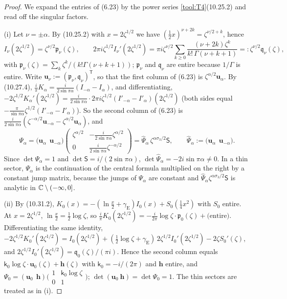 \begin{proof}
We expand the entries of (6.23) by the power series \ref{tool:T4}(10.25.2) and read off the singular factors.

(i) Let $\nu=\pm\alpha$. By (10.25.2) with $x=2\zeta^{1/2}$ we have $(\frac12x)^{\nu+2k}=\zeta^{\nu/2+k}$, hence
\[
  I_\nu(2\zeta^{1/2})=\zeta^{\nu/2}\mathfrak p_\nu(\zeta),\qquad
  2\pi i\zeta^{1/2}I_\nu'(2\zeta^{1/2})=\pi i\zeta^{\nu/2}\sum_{k\ge0}\frac{(\nu+2k)\zeta^k}{k!\,\Gamma(\nu+k+1)}
  =:\zeta^{\nu/2}\mathfrak q_\nu(\zeta),
\]
with $\mathfrak p_\nu(\zeta)=\sum_k\zeta^k/(k!\Gamma(\nu+k+1))$; $\mathfrak p_\nu$ and $\mathfrak q_\nu$ are entire because $1/\Gamma$ is entire.
Write $\mathbf u_\nu:=(\mathfrak p_\nu,\mathfrak q_\nu)^{\mathsf T}$, so that the first column of (6.23) is $\zeta^{\alpha/2}\mathbf u_\alpha$. By (10.27.4),
$\frac i\pi K_\alpha=\frac{i}{2\sin\pi\alpha}(I_{-\alpha}-I_\alpha)$, and differentiating,
$-2\zeta^{1/2}K_\alpha'(2\zeta^{1/2})=\frac{i}{2\sin\pi\alpha}\cdot2\pi i\zeta^{1/2}(I'_{-\alpha}-I'_\alpha)(2\zeta^{1/2})$
(both sides equal $-\frac{\pi}{\sin\pi\alpha}\zeta^{1/2}(I'_{-\alpha}-I'_\alpha)$). So the second column of (6.23) is
$\frac{i}{2\sin\pi\alpha}(\zeta^{-\alpha/2}\mathbf u_{-\alpha}-\zeta^{\alpha/2}\mathbf u_\alpha)$, and
\[
  \Psi_\alpha=\bigl(\mathbf u_\alpha\ \ \mathbf u_{-\alpha}\bigr)\begin{pmatrix}\zeta^{\alpha/2}&-\frac{i}{2\sin\pi\alpha}\zeta^{\alpha/2}\\
  0&\frac{i}{2\sin\pi\alpha}\zeta^{-\alpha/2}\end{pmatrix}=\hat\Psi_\alpha\,\zeta^{\alpha\sigma_3/2}\mathsf S,\qquad
  \hat\Psi_\alpha:=\bigl(\mathbf u_\alpha\ \ \mathbf u_{-\alpha}\bigr).
\]
Since $\det\Psi_\alpha=1$ and $\det\mathsf S=i/(2\sin\pi\alpha)$, $\det\hat\Psi_\alpha=-2i\sin\pi\alpha\ne0$. In a thin
sector, $\Psi_\alpha$ is the continuation of the central formula multiplied on the right by a constant jump matrix,
because the jumps of $\Psi_\alpha$ are constant and $\hat\Psi_\alpha\zeta^{\alpha\sigma_3/2}\mathsf S$ is analytic in
$\mathbb{C}\setminus(-\infty,0]$.

(ii) By (10.31.2), $K_0(x)=-(\ln\frac x2+\gamma_{\mathrm E})I_0(x)+S_0(\frac14x^2)$ with $S_0$ entire. At $x=2\zeta^{1/2}$,
$\ln\frac x2=\frac12\log\zeta$, so $\frac i\pi K_0(2\zeta^{1/2})=-\frac{i}{2\pi}\log\zeta\cdot \mathfrak p_0(\zeta)+\text{(entire)}$.
Differentiating the same identity, $-2\zeta^{1/2}K_0'(2\zeta^{1/2})=I_0(2\zeta^{1/2})+(\frac12\log\zeta+\gamma_{\mathrm E})\,
2\zeta^{1/2}I_0'(2\zeta^{1/2})-2\zeta S_0'(\zeta)$, and $2\zeta^{1/2}I_0'(2\zeta^{1/2})=\mathfrak q_0(\zeta)/(\pi i)$. Hence the
second column equals $\mathsf k_0\log\zeta\cdot\mathbf u_0(\zeta)+\mathbf h(\zeta)$ with $\mathsf k_0=-i/(2\pi)$ and $\mathbf h$ entire, and
$\Psi_0=(\mathbf u_0\ \ \mathbf h)\bigl(\begin{smallmatrix}1&\mathsf k_0\log\zeta\\0&1\end{smallmatrix}\bigr)$; $\det(\mathbf u_0\ \mathbf h)=\det\Psi_0=1$.
The thin sectors are treated as in (i).


\end{proof}
